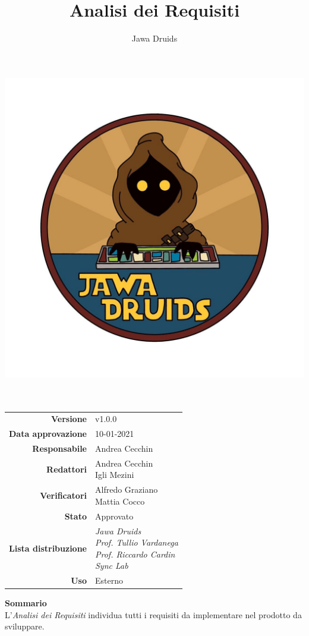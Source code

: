



\makeatletter
\begin{titlepage}
	\begin{center}
		\vspace*{-5,0cm}
		\author{Jawa Druids}
		\title{Analisi dei Requisiti}
		\date{} %
		\includegraphics[width=0.5\linewidth]{../immagini/DRUIDSLOGO.jpg}\\[4ex]
		{\huge \bfseries  \@title }\\[2ex]
		{\LARGE  \@author}\\[50ex]
		\vspace*{-9,0cm}
		\begin{table}[H]
			\renewcommand{\arraystretch}{1.4}
			\centering
			\begin{tabular}{r | l}
				\textbf{Versione} & v1.0.0 \\%
				\textbf{Data approvazione} & 10-01-2021\\
				\textbf{Responsabile} & Andrea Cecchin\\
				\textbf{Redattori} & \makecell[tl]{Andrea Cecchin \\ Igli Mezini} \\
				\textbf{Verificatori} & \makecell[tl]{Alfredo Graziano \\ Mattia Cocco } \\
				\textbf{Stato} & Approvato\\
				\textbf{Lista distribuzione} & \makecell[tl]{\textit{Jawa Druids} \\ \textit{Prof. Tullio Vardanega} \\ \textit{Prof. Riccardo Cardin} \\ \textit{Sync Lab}}\\
				\textbf{Uso} & Esterno
			\end{tabular}
		\end{table}
		\vspace{0.2cm}
		\hfill \break
		\fontsize{17}{10}\textbf{Sommario} \\
		\vspace{0.3cm}
		L'\emph{\normalsize Analisi dei Requisiti} individua tutti i requisiti da implementare nel prodotto da sviluppare.
	\end{center}
\end{titlepage}
\makeatother

